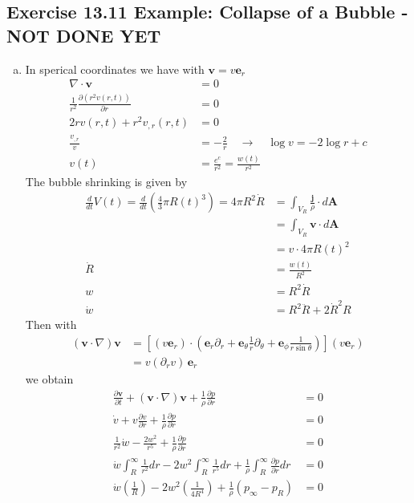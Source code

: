 \documentclass[../main.tex]{subfiles}
\begin{document}
\subsection{Exercise 13.11 Example: Collapse of a Bubble  - NOT DONE YET}
\begin{enumerate}[(a)]
\item In sperical coordinates we have with $\mathbf{v}=v\mathbf{e}_r$
\begin{align}
\nabla\cdot\mathbf{v}&=0\\
\frac{1}{r^2}\frac{\partial (r^2 v(r,t))}{\partial r}&=0\\
2rv(r,t)+r^2v_{,r}(r,t)&=0\\
\frac{v_{,r}}{v}&=-\frac{2}{r}\quad\rightarrow\quad \log v=-2\log r+c\\
v(t)&=\frac{e^c}{r^2}=\frac{w(t)}{r^2}
\end{align}
The bubble shrinking is given by
\begin{align}
\frac{d}{dt}V(t)
=\frac{d}{dt}\left(\frac{4}{3}\pi R(t)^3\right)
=4\pi R^2\dot{R}
&=\int_{V_R} \frac{\mathbf{j}}{\rho}\cdot d\mathbf{A}\\
&=\int_{V_R} \mathbf{v}\cdot d\mathbf{A}\\
&=v\cdot 4\pi R(t)^2\\
\dot{R}&=\frac{w(t)}{R^2}\\
w&=R^2\dot{R}\\
\dot{w}&=R^2\ddot{R}+2\dot{R}^2R
\end{align}
Then with
\begin{align}
(\mathbf{v}\cdot\nabla)\mathbf{v}
&=\left[(v\mathbf{e}_r)\cdot\left(\mathbf{e}_r\partial_r+\mathbf{e}_\theta\frac{1}{r}\partial_\theta+\mathbf{e}_\phi\frac{1}{r\sin\theta}\right)\right](v\mathbf{e}_r)\\
&=v(\partial_r v)\,\mathbf{e}_r
\end{align}
we obtain
\begin{align}
\frac{\partial\mathbf{v}}{\partial t}+(\mathbf{v}\cdot\nabla)\mathbf{v}+\frac{1}{\rho}\frac{\partial p}{\partial r}&=0\\
\dot{v}+v\frac{\partial v}{\partial r}+\frac{1}{\rho}\frac{\partial p}{\partial r}&=0\\
\frac{1}{r^2}\dot{w}-\frac{2w^2}{r^5}+\frac{1}{\rho}\frac{\partial p}{\partial r}&=0\\
\dot{w}\int_R^\infty\frac{1}{r^2}dr-2w^2\int_R^\infty\frac{1}{r^5}dr+\frac{1}{\rho}\int_R^\infty\frac{\partial p}{\partial r}dr&=0\\
\dot{w}\left(\frac{1}{R}\right)-2w^2\left(\frac{1}{4R^4}\right)+\frac{1}{\rho}(p_\infty-p_R)&=0

\end{align}
\end{enumerate}
\end{document}
